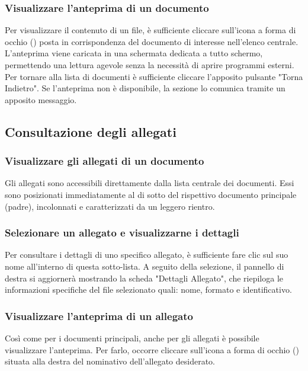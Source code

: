 \documentclass[a4paper,12pt]{article}
\begin{document}
            \subsubsection{Visualizzare l'anteprima di un documento}
            Per visualizzare il contenuto di un file, è sufficiente cliccare sull'icona a forma di occhio (\faEye) posta in corrispondenza del documento di interesse nell'elenco centrale. L'anteprima viene caricata in una schermata dedicata a tutto schermo, permettendo una lettura agevole senza la necessità di aprire programmi esterni. Per tornare alla lista di documenti è sufficiente cliccare l'apposito pulsante "Torna Indietro".
            Se l'anteprima non è disponibile, la sezione lo comunica tramite un apposito messaggio.

        \subsection{Consultazione degli allegati}
            \subsubsection{Visualizzare gli allegati di un documento}
            \label{sec:allegati}
            Gli allegati sono accessibili direttamente dalla lista centrale dei documenti. Essi sono posizionati immediatamente al di sotto del rispettivo documento principale (padre), incolonnati e caratterizzati da un leggero rientro.
            
            \subsubsection{Selezionare un allegato e visualizzarne i dettagli}
            Per consultare i dettagli di uno specifico allegato, è sufficiente fare clic sul suo nome all'interno di questa sotto-lista. A seguito della selezione, il pannello di destra si aggiornerà mostrando la scheda "Dettagli Allegato", che riepiloga le informazioni specifiche del file selezionato quali: nome, formato e identificativo.
            
            \subsubsection{Visualizzare l'anteprima di un allegato}
            Così come per i documenti principali, anche per gli allegati è possibile visualizzare l'anteprima. Per farlo, occorre cliccare sull'icona a forma di occhio (\faEye) situata alla destra del nominativo dell'allegato desiderato.
            
\end{document}
